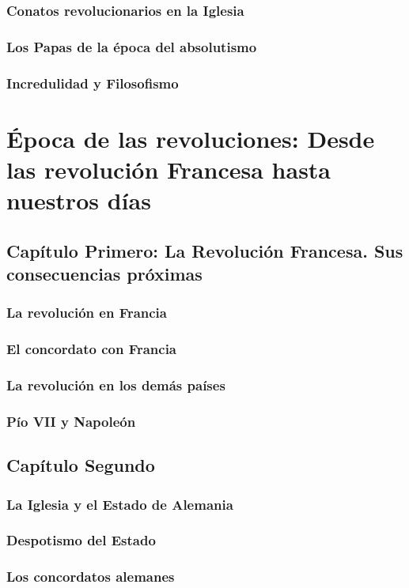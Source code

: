 \raggedbottom{} \documentclass[12pt, a4paper]{book}
\begin{document}
\section{Conatos revolucionarios en la Iglesia}
\section{Los Papas de la época del absolutismo}
\section{Incredulidad y Filosofismo}
\part{Época de las revoluciones: Desde las revolución Francesa hasta nuestros días}
\chapter{Capítulo Primero: La Revolución Francesa. Sus consecuencias próximas}
\section{La revolución en Francia}
\section{El concordato con Francia}
\section{La revolución en los demás países}
\section{Pío VII y Napoleón}
\chapter{Capítulo Segundo}
\section{La Iglesia y el Estado de Alemania}
\section{Despotismo del Estado}
\section{Los concordatos alemanes}
\end{document}
